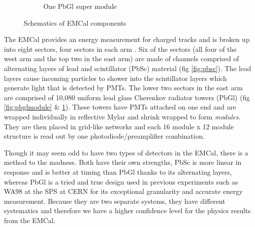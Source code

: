 \begin{figure}
\begin{subfigure}[b]{0.6\textwidth}
    \caption{One PbGl super module}
\label{fig:pbglsupmodule}
\end{subfigure}
\caption[Schematics of EMCal components]{Schematics of EMCal components}
\label{fig:EMCalcomponents}
\end{figure}
\dsp

The EMCal provides an energy measurement for charged tracks and is broken up into eight sectors, four sectors in each arm \citep{EMCfocus}. Six of the sectors (all four of the west arm and the top two in the east arm) are made of channels comprised of alternating layers of lead and scintillator (PbSc) material (fig \ref{fig:pbsc}). The lead layers cause incoming particles to shower into the scintillator layers which generate light that is detected by PMTs. The lower two sectors in the east arm are comprised of 10,080 uniform lead glass Cherenkov radiator towers (PbGl) (fig \ref{fig:pbglmodule} \& \ref{fig:pbglsupmodule}). These towers have PMTs attached on one end and are wrapped individually in reflective Mylar and shrink wrapped to form \textit{modules}. They are then placed in grid-like networks and each 16 module x 12 module structure is read out by one photodiode/preamplifier combination. 

Though it may seem odd to have two types of detectors in the EMCal, there is a method to the madness. Both have their own strengths, PbSc is more linear in response and is better at timing than PbGl thanks to its alternating layers, whereas PbGl is a tried and true design used in previous experiments such as WA98 at the SPS at CERN for its exceptional granularity and accurate energy measurement. Because they are two separate systems, they have different systematics and therefore we have a higher confidence level for the physics results from the EMCal. 



